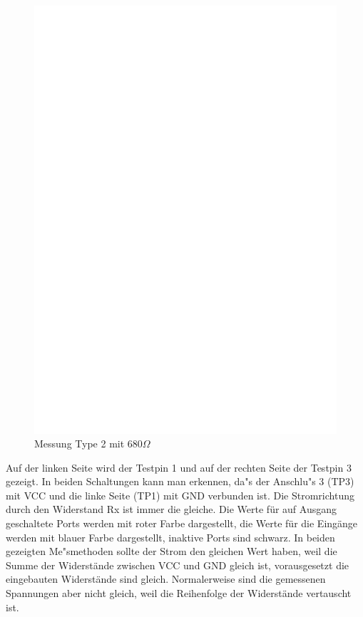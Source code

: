\begin{figure}[H]
 \centering
 \includegraphics[]{../FIG/ResistormessL2.eps}
 \caption{Messung Type 2 mit \(680\Omega\) }
\label{fig:RL2mes}
\end{figure}

Auf der linken Seite wird der Testpin 1 und auf der rechten Seite der Testpin 3 gezeigt.
In beiden Schaltungen kann man erkennen, da"s der Anschlu"s 3 (TP3) mit VCC und die linke Seite (TP1) mit
GND verbunden ist.
Die Stromrichtung durch den Widerstand Rx ist immer die gleiche.
Die Werte f\"ur auf Ausgang geschaltete Ports werden mit roter Farbe dargestellt, 
die Werte f\"ur die Eing\"ange werden mit blauer Farbe dargestellt, inaktive Ports sind schwarz.
In beiden gezeigten Me"smethoden sollte der Strom den gleichen Wert haben, weil die Summe der Widerst\"ande zwischen
VCC und GND gleich ist, vorausgesetzt die eingebauten Widerst\"ande sind gleich.
Normalerweise sind die gemessenen Spannungen aber nicht gleich, weil die Reihenfolge
der Widerst\"ande vertauscht ist.

